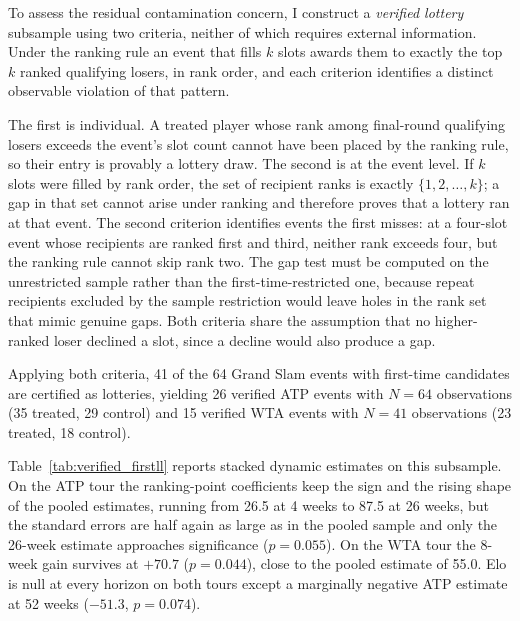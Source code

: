 To assess the residual contamination concern, I construct a \textit{verified lottery} subsample using two criteria, neither of which requires external information. Under the ranking rule an event that fills $k$ slots awards them to exactly the top $k$ ranked qualifying losers, in rank order, and each criterion identifies a distinct observable violation of that pattern.

The first is individual. A treated player whose rank among final-round qualifying losers exceeds the event's slot count cannot have been placed by the ranking rule, so their entry is provably a lottery draw. The second is at the event level. If $k$ slots were filled by rank order, the set of recipient ranks is exactly $\{1, 2, \ldots, k\}$; a gap in that set cannot arise under ranking and therefore proves that a lottery ran at that event. The second criterion identifies events the first misses: at a four-slot event whose recipients are ranked first and third, neither rank exceeds four, but the ranking rule cannot skip rank two. The gap test must be computed on the unrestricted sample rather than the first-time-restricted one, because repeat recipients excluded by the sample restriction would leave holes in the rank set that mimic genuine gaps. Both criteria share the assumption that no higher-ranked loser declined a slot, since a decline would also produce a gap.

Applying both criteria, 41 of the 64 Grand Slam events with first-time candidates are certified as lotteries, yielding 26 verified ATP events with $N = 64$ observations (35 treated, 29 control) and 15 verified WTA events with $N = 41$ observations (23 treated, 18 control).

Table~\ref{tab:verified_firstll} reports stacked dynamic estimates on this subsample. On the ATP tour the ranking-point coefficients keep the sign and the rising shape of the pooled estimates, running from 26.5 at 4 weeks to 87.5 at 26 weeks, but the standard errors are half again as large as in the pooled sample and only the 26-week estimate approaches significance ($p = 0.055$). On the WTA tour the 8-week gain survives at $+70.7$ ($p = 0.044$), close to the pooled estimate of 55.0. Elo is null at every horizon on both tours except a marginally negative ATP estimate at 52 weeks ($-51.3$, $p = 0.074$).

